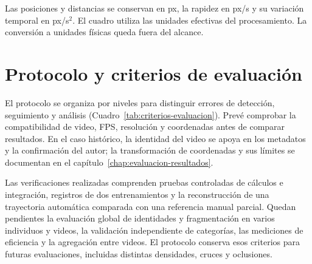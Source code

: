 Las posiciones y distancias se conservan en px, la rapidez en px/s y su variación temporal en px/s$^2$. El cuadro utiliza las unidades efectivas del procesamiento. La conversión a unidades físicas queda fuera del alcance.

\section{Protocolo y criterios de evaluación}

El protocolo se organiza por niveles para distinguir errores de detección, seguimiento y análisis (Cuadro~\ref{tab:criterios-evaluacion}). Prevé comprobar la compatibilidad de video, FPS, resolución y coordenadas antes de comparar resultados. En el caso histórico, la identidad del video se apoya en los metadatos y la confirmación del autor; la transformación de coordenadas y sus límites se documentan en el capítulo~\ref{chap:evaluacion-resultados}.

Las verificaciones realizadas comprenden pruebas controladas de cálculos e integración, registros de dos entrenamientos y la reconstrucción de una trayectoria automática comparada con una referencia manual parcial. Quedan pendientes la evaluación global de identidades y fragmentación en varios individuos y videos, la validación independiente de categorías, las mediciones de eficiencia y la agregación entre videos. El protocolo conserva esos criterios para futuras evaluaciones, incluidas distintas densidades, cruces y oclusiones.

